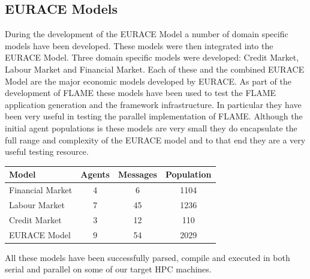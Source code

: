 \subsection{EURACE Models}
During the development of the EURACE Model a number of domain specific models have been developed. These models were then integrated into the EURACE Model. Three domain specific models were developed: Credit Market, Labour Market and Financial Market. Each of these and the combined EURACE Model are the major economic models developed by EURACE. As part of the development of FLAME these models have been used to test the FLAME application generation and the framework infrastructure. In particular they have been very useful in testing the parallel implementation of FLAME. Although the initial agent populations is these models are very small they do encapsulate the full range and complexity of the EURACE model and to that end they are a very useful testing resource.

\begin{table}[ht]
 \centering
  \begin{tabular}{l|ccc}
  Model & Agents & Messages & Population \\\hline
  Financial Market  &    4    &   6       &  1104          \\
  Labour Market   &   7     &    45      &   1236         \\
  Credit Market   &   3     &    12      &   110         \\ 
  EURACE Model    &   9     &    54       &  2029         \\\hline
  \end{tabular}
\end{table}

All these models have been successfully parsed, compile and executed in both serial and parallel on some of our target HPC machines.
